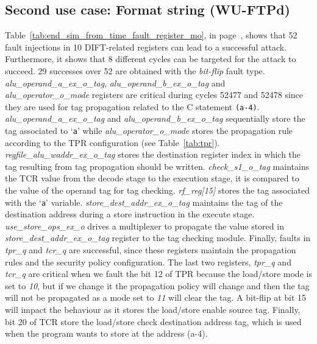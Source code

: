 \subsection{Second use case: Format string (WU-FTPd)}
Table~\ref{tab:end_sim_from_time_fault_register_mo}, in page~\pageref{tab:end_sim_from_time_fault_register_mo}, shows that 52 fault injections in 10 DIFT-related registers can lead to a successful attack. 
Furthermore, it shows that 8 different cycles can be targeted for the attack to succeed. 29 successes over 52 are obtained with the \textit{bit-flip} fault type. 
\textit{alu\_operand\_a\_ex\_o\_tag}, \textit{alu\_operand\_b\_ex\_o\_tag} and \textit{alu\_operator\_o\_mode} registers are critical during cycles 52477 and 52478 since they are used for tag propagation related to the C statement \verb|(a-4)|. \textit{alu\_operand\_a\_ex\_o\_tag} and \textit{alu\_operand\_b\_ex\_o\_tag} sequentially store the tag associated to `\verb|a|' while \textit{alu\_operator\_o\_mode} stores the propagation rule according to the TPR configuration (see Table~\ref{tab:tpr}). \textit{regfile\_alu\_waddr\_ex\_o\_tag} stores the destination register index in which the tag resulting from tag propagation should be written.
\textit{check\_s1\_o\_tag} maintains the TCR value from the decode stage to the execution stage, it is compared to the value of the operand tag for tag checking.
\textit{rf\_reg[15]} stores the tag associated with the `\verb|a|' variable.
\textit{store\_dest\_addr\_ex\_o\_tag} maintains the tag of the destination address during a store instruction in the execute stage. 
\textit{use\_store\_ops\_ex\_o} drives a multiplexer to propagate the value stored in \textit{store\_dest\_addr\_ex\_o\_tag} register to the tag checking module.
Finally, faults in \textit{tpr\_q} and \textit{tcr\_q} are successful, since these registers maintain the propagation rules and the security policy configuration. 
The last two registers, \textit{tpr\_q} and \textit{tcr\_q} are critical when we fault the bit 12 of TPR because the load/store mode is set to \textit{10}, but if we change it the propagation policy will change and then the tag will not be propagated as a mode set to \textit{11} will clear the tag. A bit-flip at bit 15 will impact the behaviour as it stores the load/store enable source tag. Finally, bit 20 of TCR store the load/store check destination address tag, which is used when the program wants to store at the address (a-4).

